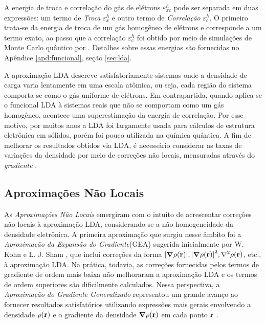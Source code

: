 A energia de troca e correlação do gás de elétrons $ \varepsilon_{xc}^{h} $ pode ser separada em duas expressões: um termo de \textit{Troca} $ \varepsilon_{x}^{h} $ e outro termo de \textit{Correlação} $ \varepsilon_{c}^{h} $. O primeiro trata-se da energia de troca de um gás homogêneo de elétrons e corresponde a um termo exato, ao passo que a correlação $ \varepsilon_{c}^{h} $ foi obtido por meio de simulações de Monte Carlo quântico por \citeauthor{ceperley}. Detalhes sobre essas energias são fornecidas no Apêndice \ref{apd:funcional}, seção \ref{sec:lda}.

A aproximação LDA descreve satisfatoriamente sistemas onde a densidade de carga varia lentamente em uma escala atômica, ou seja, cada região do sistema comporta-se como o gás uniforme de elétrons. Em contrapartida, quando aplica-se o funcional LDA à sistemas reais que não se comportam como um gás homogêneo, acontece uma superestimação da energia de correlação. Por esse motivo, por muitos anos a LDA foi largamente usada para cálculos de estrutura eletrônica em sólidos, porém foi pouco utilizada na química quântica. A fim de melhorar os resultados obtidos via LDA, é necessário considerar as taxas de variações da densidade por meio de correções não locais, mensuradas através do \textit{gradiente} \cite{revista-quimica}.
%

\subsection{Aproximações Não Locais}

As \textit{Aproximações Não Locais} emergiram com o intuito de acrescentar correções não locais à aproximação LDA, considerando-se a não homogeneidade da densidade eletrônica. A primeira aproximação que surgiu nesse âmbito foi a \textit{Aproximação da Expansão do Gradiente}(GEA) sugerida inicialmente por W. Kohn e L. J. Sham \cite{kohn_sham}, que inclui correções da forma $ \abs{\grad{\dens}}, \abs{\grad{\dens}}^2, \laplacian{\dens} $, etc., à aproximação LDA. Na prática, todavia, as correções fornecidas pelos termos de gradiente de ordem mais baixa não melhoraram a aproximação LDA e os termos de ordem superiores são dificilmente calculados. Nessa perspectiva, a \textit{Aproximação do Gradiente Generalizado} representou um grande avanço ao fornecer resultados satisfatórios utilizando expressões mais gerais envolvendo a densidade $ \rho(\vb{r}) $  e o gradiente da densidade $ \grad{\ensuremath{\rho(\vb{r})}} $ em cada ponto $ \vb{r} $ \cite{capelle}.  



